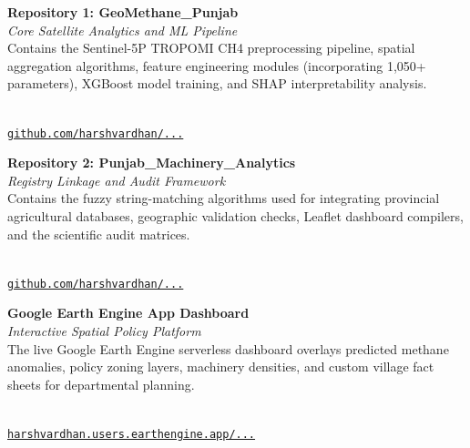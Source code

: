 \documentclass[12pt,a4paper]{report}
\begin{document}
\noindent
\begin{minipage}[t]{0.48\textwidth}
\textbf{Repository 1: GeoMethane\_Punjab}\\
\textit{Core Satellite Analytics and ML Pipeline}\\
Contains the Sentinel-5P TROPOMI CH4 preprocessing pipeline, spatial aggregation algorithms, feature engineering modules (incorporating 1,050+ parameters), XGBoost model training, and SHAP interpretability analysis.
\begin{center}
    \\
    \vspace{0.1cm}
    \small\href{https://github.com/harshvardhan/GeoMethane_Punjab}{\texttt{github.com/harshvardhan/...}}
\end{center}
\end{minipage}
\hfill
\begin{minipage}[t]{0.48\textwidth}
\textbf{Repository 2: Punjab\_Machinery\_Analytics}\\
\textit{Registry Linkage and Audit Framework}\\
Contains the fuzzy string-matching algorithms used for integrating provincial agricultural databases, geographic validation checks, Leaflet dashboard compilers, and the scientific audit matrices.
\begin{center}
    \\
    \vspace{0.1cm}
    \small\href{https://github.com/harshvardhan/Punjab_Machinery_Analytics}{\texttt{github.com/harshvardhan/...}}
\end{center}
\end{minipage}

\vspace{0.6cm}

\begin{center}
\begin{minipage}{0.6\textwidth}
\centering
\textbf{Google Earth Engine App Dashboard}\\
\textit{Interactive Spatial Policy Platform}\\
The live Google Earth Engine serverless dashboard overlays predicted methane anomalies, policy zoning layers, machinery densities, and custom village fact sheets for departmental planning.
\begin{center}
    \\
    \vspace{0.1cm}
    \small\href{https://harshvardhan.users.earthengine.app/view/punjab-methane-machinery}{\texttt{harshvardhan.users.earthengine.app/...}}
\end{center}
\end{minipage}
\end{center}
\end{document}
